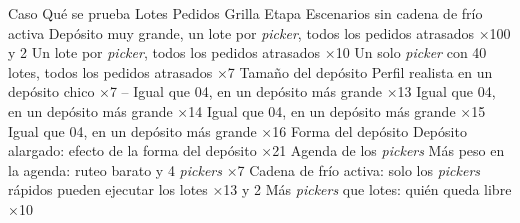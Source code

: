 \startplacetable[reference=tab:escenarios_estres, location=here, title={Escenarios de estrés y qué se prueba en cada uno. La columna Etapa indica qué etapa del modelo Split presiona cada escenario.}]
	\bTABLE[split=yes, align=middle, frame=on, width=fit]
	\setupTABLE[row][1][background=color, backgroundcolor=darkgray, style=bold]
	\setupTABLE[column][2][width=6cm, align=flushleft]
	\bTR \bTH Caso \eTH \bTH Qué se prueba \eTH \bTH Lotes \eTH {} \eTH \bTH Pedidos \eTH \bTH Grilla \eTH \bTH Etapa \eTH \eTR
	\bTR \bTD[nc=7, style=bold, align=flushleft] Escenarios sin cadena de frío activa \eTD \eTR
	\bTR {} \eTD \bTD Depósito muy grande, un lote por {\em picker}, todos los pedidos atrasados \eTD {} \eTD {} \eTD {} \eTD {}×100 \eTD {} y 2 \eTD \eTR
	\bTR {} \eTD \bTD Un lote por {\em picker}, todos los pedidos atrasados \eTD {} \eTD {} \eTD {} \eTD {}×10 \eTD {} \eTD \eTR
	\bTR {} \eTD \bTD Un solo {\em picker} con 40 lotes, todos los pedidos atrasados \eTD {} \eTD {} \eTD {} \eTD {}×7 \eTD {} \eTD \eTR
	\bTR \bTD[nc=7, style=bold, align=flushleft] Tamaño del depósito \eTD \eTR
	\bTR {} \eTD \bTD Perfil realista en un depósito chico \eTD {} \eTD {} \eTD {} \eTD {}×7 \eTD \bTD -- \eTD \eTR
	\bTR {} \eTD \bTD Igual que 04, en un depósito más grande \eTD {} \eTD {} \eTD {} \eTD {}×13 \eTD {} \eTD \eTR
	\bTR {} \eTD \bTD Igual que 04, en un depósito más grande \eTD {} \eTD {} \eTD {} \eTD {}×14 \eTD {} \eTD \eTR
	\bTR {} \eTD \bTD Igual que 04, en un depósito más grande \eTD {} \eTD {} \eTD {} \eTD {}×15 \eTD {} \eTD \eTR
	\bTR {} \eTD \bTD Igual que 04, en un depósito más grande \eTD {} \eTD {} \eTD {} \eTD {}×16 \eTD {} \eTD \eTR
	\bTR \bTD[nc=7, style=bold, align=flushleft] Forma del depósito \eTD \eTR
	\bTR {} \eTD \bTD Depósito alargado: efecto de la forma del depósito \eTD {} \eTD {} \eTD {} \eTD {}×21 \eTD {} \eTD \eTR
	\bTR \bTD[nc=7, style=bold, align=flushleft] Agenda de los {\em pickers} \eTD \eTR
	\bTR {} \eTD \bTD Más peso en la agenda: ruteo barato y 4 {\em pickers} \eTD {} \eTD {} \eTD {} \eTD {}×7 \eTD {} \eTD \eTR
	\bTR {} \eTD \bTD Cadena de frío activa: solo los {\em pickers} rápidos pueden ejecutar los lotes \eTD {} \eTD {} \eTD {} \eTD {}×13 \eTD {} y 2 \eTD \eTR
	\bTR {} \eTD \bTD Más {\em pickers} que lotes: quién queda libre \eTD {} \eTD {} \eTD {} \eTD {}×10 \eTD {} \eTD \eTR
